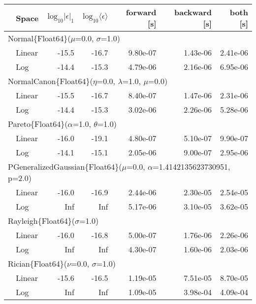 \begin{tabular}{|llrrrrr|} \hline
& Space & $\mbox{log}_{10}|\epsilon|_1$ & $\mbox{log}_{10}\langle\epsilon\rangle$ & forward [s] & backward [s] & both [s]\\ \hline
\multicolumn{7}{|l|}{Normal\{Float64\}($\mu$=0.0, $\sigma$=1.0)}\\ \hline
& Linear & {\color{blue}-15.5} & {\color{blue}-16.7} & {\color{blue}9.80e-07} & {\color{blue}1.43e-06} & {\color{blue}2.41e-06}\\
& Log & -14.4 & -15.3 & 4.79e-06 & 2.16e-06 & 6.95e-06\\
\hline
\multicolumn{7}{|l|}{NormalCanon\{Float64\}($\eta$=0.0, $\lambda$=1.0, $\mu$=0.0)}\\ \hline
& Linear & {\color{blue}-15.5} & {\color{blue}-16.7} & {\color{blue}8.40e-07} & {\color{blue}1.47e-06} & {\color{blue}2.31e-06}\\
& Log & -14.4 & -15.3 & 3.02e-06 & 2.26e-06 & 5.28e-06\\
\hline
\multicolumn{7}{|l|}{Pareto\{Float64\}($\alpha$=1.0, $\theta$=1.0)}\\ \hline
& Linear & {\color{blue}-16.0} & {\color{blue}-19.1} & {\color{blue}4.80e-07} & {\color{blue}5.10e-07} & {\color{blue}9.90e-07}\\
& Log & -14.1 & -15.1 & 2.05e-06 & 9.00e-07 & 2.95e-06\\
\hline
\multicolumn{7}{|l|}{PGeneralizedGaussian\{Float64\}($\mu$=0.0, $\alpha$=1.4142135623730951, p=2.0)}\\ \hline
& Linear & {\color{blue}-16.0} & {\color{blue}-16.9} & {\color{blue}2.44e-06} & {\color{blue}2.30e-05} & {\color{blue}2.54e-05}\\
& Log & Inf & Inf & 5.17e-06 & 3.10e-05 & 3.62e-05\\
\hline
\multicolumn{7}{|l|}{Rayleigh\{Float64\}($\sigma$=1.0)}\\ \hline
& Linear & {\color{blue}-16.0} & {\color{blue}-16.8} & 5.00e-07 & 1.76e-06 & 2.26e-06\\
& Log & Inf & Inf & {\color{blue}4.30e-07} & {\color{blue}1.60e-06} & {\color{blue}2.03e-06}\\
\hline
\multicolumn{7}{|l|}{Rician\{Float64\}($\nu$=0.0, $\sigma$=1.0)}\\ \hline
& Linear & {\color{blue}-15.6} & {\color{blue}-16.5} & 1.19e-05 & {\color{blue}7.51e-05} & {\color{blue}8.70e-05}\\
& Log & Inf & Inf & {\color{blue}1.09e-05} & 3.98e-04 & 4.09e-04\\

\end{tabular}
